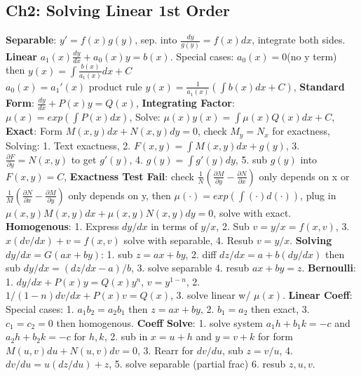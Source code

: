 \subsection*{Ch2: Solving Linear 1st Order}
\textbf{Separable}: $y' = f(x)g(y)$, sep. into $\frac{dy}{g(y)} = f(x)dx$, integrate both sides. \\
\textbf{Linear} $a_1(x)\frac{dy}{dx} + a_0(x)y = b(x)$. Special cases: $a_0(x) = 0$(no y term) then $y(x) = \int \frac{b(x)}{a_1(x)}dx + C$ \\
$a_0(x) = a_1'(x)$ product rule $y(x) = \frac{1}{a_1(x)}(\int b(x)dx + C)$, 
\textbf{Standard Form}: $\frac{dy}{dx} + P(x)y = Q(x)$, \textbf{Integrating Factor}: $\mu(x) = exp(\int P(x)dx)$, 
Solve: $\mu(x)y(x) = \int \mu(x)Q(x)dx + C$, \textbf{Exact}: Form $M(x,y)dx + N(x,y)dy = 0$, check $M_y = N_x$ for exactness, 
Solving: 
1. Text exactness, 
2. $F(x,y) = \int M(x,y)dx + g(y)$, 
3. $\frac{\partial F}{\partial y} = N(x,y)$ to get $g'(y)$,
4. $g(y) = \int g'(y)dy$,
5. sub $g(y)$ into $F(x,y) = C$, 
\textbf{Exactness Test Fail}: check $\frac{1}{N}(\frac{\partial M}{\partial y} - \frac{\partial N}{\partial x})$ only depends on x 
or $\frac{1}{M}(\frac{\partial N}{\partial x} - \frac{\partial M}{\partial y})$ only depends on y, then $\mu(\cdot) = exp(\int (\cdot) d(\cdot))$,
plug in $\mu(x,y)M(x,y)dx + \mu(x,y)N(x,y)dy = 0$, solve with exact. 
\textbf{Homogenous}:
1. Express $dy/dx$ in terms of $y/x$, 
2. Sub $v = y/x = f(x,v)$, 
3. $x(dv/dx) + v = f(x,v)$ solve with separable,
4. Resub $v = y/x$. 
\textbf{Solving $dy/dx = G(ax + by)$}: 
1. sub $z= ax + by$, 
2. diff $dz/dx = a + b(dy/dx)$ then sub $dy/dx = (dz/dx - a)/b$, 
3. solve separable
4. resub $ax + by = z$. 
\textbf{Bernoulli}: 
1. $dy/dx + P(x)y = Q(x)y^n$, $v = y^{1-n}$, 
2. $1/(1-n)dv/dx + P(x)v = Q(x)$, 
3. solve linear w/ $\mu(x)$. 
\textbf{Linear Coeff}: 
Special cases: 
1. $a_1b_2 = a_2b_1$ then $z = ax+by$, 
2. $b_1 = a_2$ then exact, 
3. $c_1 = c_2 = 0$ then homogenous. 
\textbf{Coeff Solve}: 
1. solve system $a_1h + b_1k = -c$ and $a_2h + b_2k = -c$ for $h, k$, 
2. sub in $x = u + h$ and $y = v + k$ for form $M(u, v)du + N(u, v)dv = 0$,
3. Rearr for $dv/du$, sub $z = v/u$,
4. $dv/du = u(dz/du) + z$, 
5. solve separable (partial frac)
6. resub $z, u, v$.


